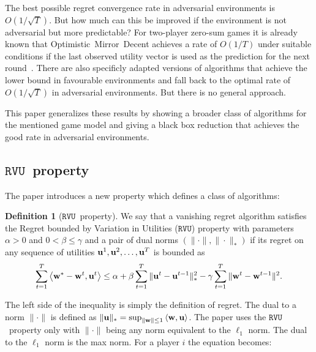 \documentclass[a4paper]{article}
\theoremstyle{definition}
\newtheorem{defn}[theorem]{Definition}
\newcommand{\myprop}{\ensuremath{\texttt{RVU}}}
\renewcommand{\vec}[1]{\ensuremath{{\bf #1}}}
\newcommand{\dotp}[2]{\ensuremath{\left\langle #1, #2 \right\rangle}}
\begin{document}
The best possible regret convergence rate in adversarial environments is
$O(1/\sqrt{T})$.
But how much can this be improved if the environment is not
adversarial but more predictable?
For two-player zero-sum games it is already known that
Optimistic~Mirror~Decent achieves a rate of $O(1/T)$ under suitable
conditions if the last observed utility vector is used as the
prediction for the next round~\cite{2013arXiv1311.1869R}.
There are also specificly adapted versions of algorithms that achieve
the lower bound in favourable environments and fall back to the
optimal rate of $O(1/\sqrt{T})$ in adversarial environments.
But there is no general approach.

This paper generalizes these results by
showing a broader class of algorithms for the mentioned game model
and giving a black box reduction that achieves the good rate in
adversarial environments.

\subsection{\myprop~property}
\label{sec:myprop}

\setcounter{theorem}{2}

The paper introduces a new property which defines a class of
algorithms:
\begin{defn}[\myprop~property]
  We say that a vanishing regret algorithm satisfies the Regret
  bounded by Variation in Utilities (\myprop) property with parameters
  $\alpha > 0$ and $0 < \beta \leq \gamma$ and a pair of dual norms
  $(\|\cdot\|, \|\cdot\|_*)$  if its regret on any sequence of utilities
  $\vec{u}^1, \vec{u}^2, \ldots, \vec{u}^T$ is bounded as
  \begin{equation}
    \sum_{t=1}^{T} \dotp{\vec{w}^*- \vec{w}^t}{\vec{u}^t} \leq \alpha
    +\beta \sum_{t=1}^{T} \| \vec{u}^t - \vec{u}^{t-1}\|_*^2 -
    \gamma\sum_{t=1}^{T} \|\vec{w}^{t} - \vec{w}^{t-1}\|^2.
    \label{eqn:reg-form}
  \end{equation}  
  \label{defn:alg-class}
\end{defn}


The left side of the inequality is simply the definition of regret.
The dual to a norm $\|\cdot\|$ is defined as $\|\vec{u}\|_* = \sup_{\|\vec{w}\|
  \leq 1} \dotp{\vec{w}}{\vec{u}}$.
The paper uses the \myprop~property only with
 $\|\cdot\|$ being any norm equivalent to the
 $\ell_1$ norm.
 The dual to the $\ell_1$ norm is the max norm.
 For a player $i$ the equation becomes:
\end{document}
